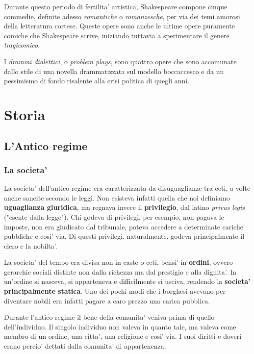 \documentclass{article}
\begin{document}
{{    Durante questo periodo di fertilita' artistica, Shakespeare compone cinque commedie, definite adesso \textit{romantiche} o \textit{romanzesche}, per via dei temi amorosi della letteratura cortese. Queste opere sono anche le ultime opere puramente comiche che Shakespeare scrive, iniziando tuttavia a sperimentare il genere \textit{tragicomico}.

    I \textit{drammi dialettici}, o \textit{problem plays}, sono quattro opere che sono accomunate dallo stile di una novella drammatizzata sul modello boccaccesco e da un pessimismo di fondo risalente alla crisi politica di quegli anni.
  }

  \pagebreak
  \section{Storia}
  {
    \subsection{L'Antico regime}
    \subsubsection{La societa'}
    La societa' dell'antico regime era caratterizzata da disuguaglianze tra ceti, a volte anche sancite secondo le leggi. Non esisteva infatti quella che noi definiamo \textbf{uguaglianza giuridica}, ma regnava invece il \textbf{privilegio}, dal latino \textit{privus legis} \small{("esente dalla legge")}. Chi godeva di privilegi, per esempio, non pagava le imposte, non era giudicato dal tribunale, poteva accedere a determinate cariche pubbliche e cosi' via. Di questi privilegi, naturalmente, godeva principalmente il clero e la nobilta'.

    La societa' del tempo era divisa non in caste o ceti, bensi' in \textbf{ordini}, ovvero gerarchie sociali distinte non dalla richezza ma dal prestigio e alla dignita'. In un'ordine si nasceva, si apparteneva e difficilmente si usciva, rendendo la \textbf{societa' principalmente statica}. Uno dei pochi modi che i borghesi avevano per diventare nobili era infatti pagare a caro prezzo una carica pubblica.

    Durante l'antico regime il bene della comunita' veniva prima di quello dell'individuo. Il singolo individuo non valeva in quanto tale, ma valeva come membro di un ordine, una citta', una religione e cosi' via. I suoi diritti e doveri erano percio' dettati dalla comunita' di appartenenza.

}}
\end{document}
